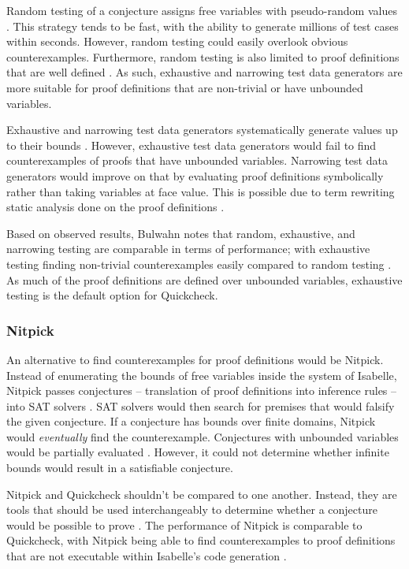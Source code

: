 Random testing of a conjecture assigns free variables with pseudo-random values \cite[Sec. 3.1]{isabelleQuickcheck}. This strategy tends to be fast, 
with the ability to generate millions of test cases within seconds. However, random testing could easily overlook obvious counterexamples. 
Furthermore, random testing is also limited to proof definitions that are well defined \cite{isabelleQuickcheck}. As such, exhaustive and narrowing 
test data generators are more suitable for proof definitions that are non-trivial or have unbounded variables.

Exhaustive and narrowing test data generators systematically generate values up to their bounds \cite{isabelleQuickcheck}. 
However, exhaustive test data generators would fail to find counterexamples of proofs that have unbounded variables. Narrowing test data generators 
would improve on that by evaluating proof definitions symbolically rather than taking variables at face value. This is possible due to 
term rewriting static analysis done on the proof definitions \cite[Sec. 5]{isabelleQuickcheck}.

Based on observed results, Bulwahn notes that random, exhaustive, and narrowing testing are comparable in terms of performance; with 
exhaustive testing finding non-trivial counterexamples easily compared to random testing \cite[Sec. 7]{isabelleQuickcheck}. As much of the 
proof definitions are defined over unbounded variables, exhaustive testing is the default option for Quickcheck.

\subsubsection{Nitpick}
\label{sec:Nitpick}

An alternative to find counterexamples for proof definitions would be Nitpick. Instead of enumerating the bounds of free variables inside the 
system of Isabelle, Nitpick passes conjectures -- translation of proof definitions into inference rules -- into SAT solvers 
\cite[Sec. 5]{isabelleProof}. SAT solvers would then search for premises that would falsify the given conjecture. If a conjecture 
has bounds over finite domains, Nitpick would \emph{eventually} find the counterexample. Conjectures with unbounded variables would be partially 
evaluated \cite[Sec. 5.2]{isabelleProof}. However, it could not determine whether infinite bounds would result in a satisfiable conjecture.

Nitpick and Quickcheck shouldn't be compared to one another. Instead, they are tools that should be used interchangeably to determine 
whether a conjecture would be possible to prove \cite{isabelleQuickcheck}. The performance of Nitpick is comparable to Quickcheck, with 
Nitpick being able to find counterexamples to proof definitions that are not executable within Isabelle's code generation 
\cite[Sec. 7]{isabelleQuickcheck}.

